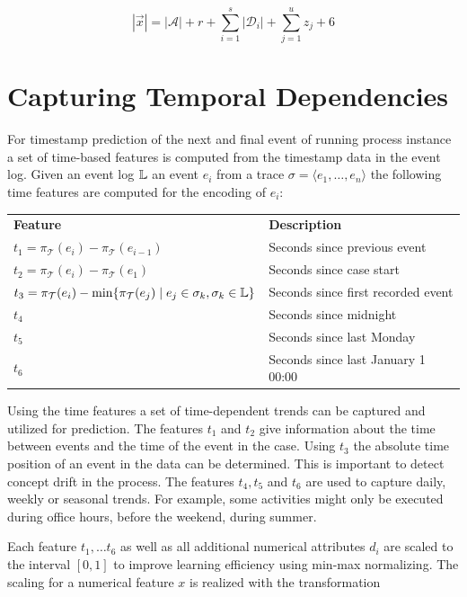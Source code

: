 \begin{equation}
	|\vec{x}|= |\mathcal{A}| + r + \sum_{i=1}^{s} |\mathcal{D}_i| + \sum_{j=1}^{u} z_j + 6
\end{equation}


\section{Capturing Temporal Dependencies}\label{sec:time}


For timestamp prediction of the next and final event of running process instance a set of time-based features is computed from the timestamp data in the event log.
Given an event log $\mathbb{L}$ an event $e_i$ from a trace $\sigma = \langle e_1, \dots, e_n \rangle$ the following time features are computed for the encoding of $e_i$: 

\begin{center}
\begin{tabularx}{\textwidth}{l l}
	\centering
	 \textbf{Feature} & \textbf{Description} \\
	$t_1 = \pi_\mathcal{T}(e_i) - \pi_\mathcal{T}(e_{i-1})$ & Seconds since previous event \\
	$t_2 = \pi_\mathcal{T}(e_i) - \pi_\mathcal{T}(e_1)$ & Seconds since case start \\
	$t_3 = \pi_\mathcal{T}(e_i) - \min\{\pi_\mathcal{T}(e_{j}) \mid  e_j \in \sigma_k, \sigma_k \in \mathbb{L}\}$ & Seconds since first recorded event \\
	$t_4$ & Seconds since midnight \\
	$t_5$ & Seconds since last Monday \\
	$t_6$ & Seconds since last January 1 00:00
\end{tabularx}
\end{center}

Using the time features a set of time-dependent trends can be captured and utilized for prediction.
The features $t_1$ and $t_2$ give information about the time between events and the time of the event in the case.
Using $t_3$ the absolute time position of an event in the data can be determined.
This is important to detect concept drift in the process.
The features $t_4, t_5$ and $t_6$ are used to capture daily, weekly or seasonal trends.
For example, some activities might only be executed during office hours, before the weekend, during summer.

Each feature $t_1, \dots t_6$ as well as all additional numerical attributes $d_i$ are scaled to the interval $ [0, 1]$ to improve learning efficiency using min-max normalizing.
The scaling for a numerical feature $x$ is realized with the transformation

